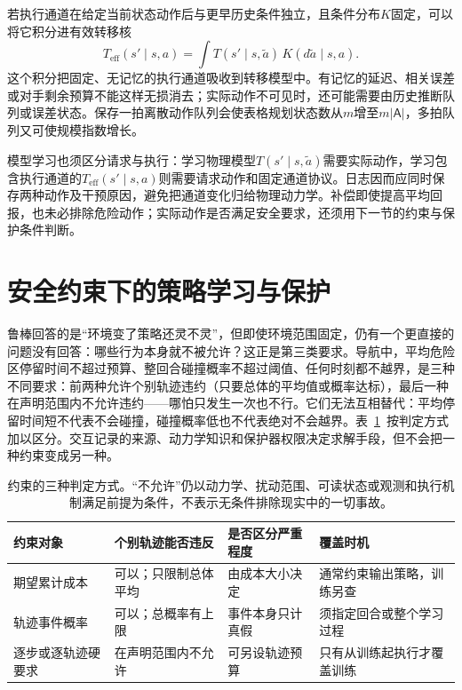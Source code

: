 若执行通道在给定当前状态动作后与更早历史条件独立，且条件分布$K$固定，可以将它积分进有效转移核
\[
  T_{\mathrm{eff}}(s'\mid s,a)
    =\int T(s'\mid s,\widetilde a)\,K(d\widetilde a\mid s,a).
\]
这个积分把固定、无记忆的执行通道吸收到转移模型中。有记忆的延迟、相关误差或对手剩余预算不能这样无损消去；实际动作不可见时，还可能需要由历史推断队列或误差状态。保存一拍离散动作队列会使表格规划状态数从$m$增至$m|\mathsf A|$，多拍队列又可使规模指数增长。

模型学习也须区分请求与执行：学习物理模型$T(s'\mid s,\widetilde a)$需要实际动作，学习包含执行通道的$T_{\mathrm{eff}}(s'\mid s,a)$则需要请求动作和固定通道协议。日志因而应同时保存两种动作及干预原因，避免把通道变化归给物理动力学。补偿即使提高平均回报，也未必排除危险动作；实际动作是否满足安全要求，还须用下一节的约束与保护条件判断。

\section{安全约束下的策略学习与保护}
\label{sec:rl-trustworthy-safety}

鲁棒回答的是“环境变了策略还灵不灵”，但即使环境范围固定，仍有一个更直接的问题没有回答：哪些行为本身就不被允许？这正是第三类要求。导航中，平均危险区停留时间不超过预算、整回合碰撞概率不超过阈值、任何时刻都不越界，是三种不同要求：前两种允许个别轨迹违约（只要总体的平均值或概率达标），最后一种在声明范围内不允许违约——哪怕只发生一次也不行。它们无法互相替代：平均停留时间短不代表不会碰撞，碰撞概率低也不代表绝对不会越界。表~\ref{tab:rl-trustworthy-constraint-types}~按判定方式加以区分。交互记录的来源、动力学知识和保护器权限决定求解手段，但不会把一种约束变成另一种。

\begin{table}[htbp]
  \centering
  \begin{tabularx}{\linewidth}{@{}>{\raggedright\arraybackslash}p{22mm}XXX@{}}
    \toprule
    约束对象 & 个别轨迹能否违反 & 是否区分严重程度 & 覆盖时机 \\
    \midrule
    期望累计成本 & 可以；只限制总体平均 & 由成本大小决定 & 通常约束输出策略，训练另查 \\
    轨迹事件概率 & 可以；总概率有上限 & 事件本身只计真假 & 须指定回合或整个学习过程 \\
    逐步或逐轨迹硬要求 & 在声明范围内不允许 & 可另设轨迹预算 & 只有从训练起执行才覆盖训练 \\
    \bottomrule
  \end{tabularx}
  \caption{约束的三种判定方式。“不允许”仍以动力学、扰动范围、可读状态或观测和执行机制满足前提为条件，不表示无条件排除现实中的一切事故。}
  \label{tab:rl-trustworthy-constraint-types}
\end{table}

